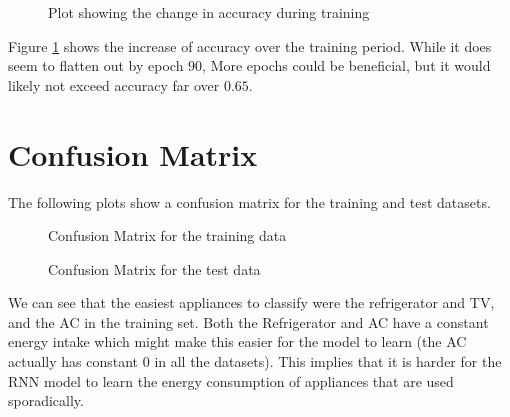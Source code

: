 \documentclass[a4paper, article, oneside, USenglish, IN5460]{memoir}
\begin{document}
\begin{figure}[H]
  \centering
    
  \caption{Plot showing the change in accuracy during training}
  \label{rnn-acc}
\end{figure}

Figure \ref{rnn-acc} shows the increase of accuracy over the training period. While it does seem to flatten out by epoch $90$, More epochs could be beneficial, but it would likely not exceed accuracy far over $0.65$.


\section{Confusion Matrix}

The following plots show a confusion matrix for the training and test datasets. 

\begin{figure}[H]
  \centering
    
  \caption{Confusion Matrix for the training data}
\end{figure}

\begin{figure}[H]
  \centering
    
  \caption{Confusion Matrix for the test data}
\end{figure}

We can see that the easiest appliances to classify were the refrigerator and TV, and the AC in the training set. Both the Refrigerator and AC have a constant energy intake which might make this easier for the model to learn (the AC actually has constant $0$ in all the datasets). This implies that it is harder for the RNN model to learn the energy consumption of appliances that are used sporadically.


\end{document}
